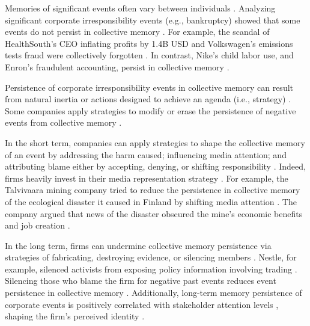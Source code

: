 \documentclass[9pt,twocolumn,twoside,lineno]{pnas-new}
\begin{document}
Memories of significant events often vary between individuals \cite{mena2016forgetting}. 
Analyzing significant corporate irresponsibility events (e.g., bankruptcy) showed that some events do not persist in collective memory \cite{crane2013modern,fig2005manufacturing}.
For example, the scandal of HealthSouth's CEO inflating profits by 1.4B USD  \cite{goodman2003rebranding} and Volkswagen's emissions tests fraud were collectively forgotten \cite{tuttle2015volkswagen}.
In contrast, Nike's child labor use, and Enron's fraudulent accounting, persist in collective memory \cite{mena2016forgetting}.

Persistence of corporate irresponsibility events in collective memory can result from natural inertia or actions designed to achieve an agenda (i.e., strategy) \cite{fine2012sticky}.
Some companies apply strategies to modify or erase the persistence of negative events from collective memory \cite{fine2012sticky, brockmeier2002remembering}.

In the short term, companies can apply strategies to shape the collective memory of an event by addressing the harm caused; influencing media attention; and attributing blame either by accepting, denying, or shifting responsibility \cite{zadek2004civil, mcdonnell2013keeping, storm2012durability}.
Indeed, firms heavily invest in their media representation strategy \cite{desai2014impact}.
For example, the Talvivaara mining company tried to reduce the persistence in collective memory of the ecological disaster it caused in Finland by shifting media attention \cite{mena2016forgetting}.
The company argued that news of the disaster obscured the mine's economic benefits and job creation \cite{mena2016forgetting}.

In the long term, firms can undermine collective memory persistence via strategies of fabricating, destroying evidence, or silencing members \cite{mena2016forgetting,fine2012sticky}.
Nestle, for example, silenced activists from exposing policy information involving trading \cite{mena2016forgetting}.
Silencing those who blame the firm for negative past events reduces event persistence in collective memory \cite{fine2012sticky}.
Additionally, long-term memory persistence of corporate events is positively correlated with stakeholder attention levels \cite{desai2014impact}, shaping the firm's perceived identity \cite{scott2000stakeholder}.
\end{document}
